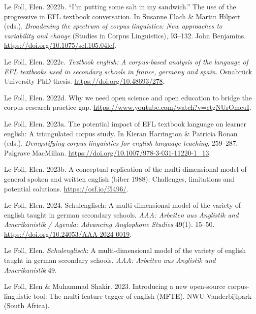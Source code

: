 \documentclass[
  letterpaper,
  DIV=11,
  numbers=noendperiod]{scrreprt}
\newlength{\cslhangindent}
\newenvironment{CSLReferences}[2] %
 {\begin{list}{}{%
  \setlength{\itemindent}{0pt}
  \setlength{\leftmargin}{0pt}
  \setlength{\parsep}{0pt}
  \ifodd #1
   \setlength{\leftmargin}{\cslhangindent}
   \setlength{\itemindent}{-1\cslhangindent}
  \fi
  \setlength{\itemsep}{#2\baselineskip}}}
 {\end{list}}
\begin{document}
\begin{CSLReferences}{1}{0}
Le Foll, Elen. 2022b. {``I'm putting some salt in my sandwich.''} The
use of the progressive in EFL textbook conversation. In Susanne Flach \&
Martin Hilpert (eds.), \emph{Broadening the spectrum of corpus
linguistics: New approaches to variability and change} (Studies in
Corpus Linguistics), 93--132. John Benjamins.
\url{https://doi.org/10.1075/scl.105.04lef}.

Le Foll, Elen. 2022c. \emph{Textbook english: A corpus-based analysis of
the language of EFL textbooks used in secondary schools in france,
germany and spain}. Osnabrück University PhD thesis.
\url{https://doi.org/10.48693/278}.

Le Foll, Elen. 2022d. Why we need open science and open education to
bridge the corpus research-practice gap.
\url{https://www.youtube.com/watch?v=ctgNUrOmcuI}.

Le Foll, Elen. 2023a. The potential impact of EFL textbook language on
learner english: A triangulated corpus study. In Kieran Harrington \&
Patricia Ronan (eds.), \emph{Demystifying corpus linguistics for english
language teaching}, 259--287. Palgrave MacMillan.
\url{https://doi.org/10.1007/978-3-031-11220-1_13}.

Le Foll, Elen. 2023b. A conceptual replication of the multi-dimensional
model of general spoken and written english (biber 1988): Challenges,
limitations and potential solutions. \url{https://osf.io/f5496/}.

Le Foll, Elen. 2024. Schulenglisch: A multi-dimensional model of the
variety of english taught in german secondary schools. \emph{AAA:
Arbeiten aus Anglistik und Amerikanistik / Agenda: Advancing Anglophone
Studies} 49(1). 15--50. \url{https://doi.org/10.24053/AAA-2024-0019}.

Le Foll, Elen. {\emph{Schulenglisch}}: A multi-dimensional model of the
variety of english taught in german secondary schools. \emph{AAA:
Arbeiten aus Anglistik und Amerikanistik} 49.

Le Foll, Elen \& Muhammad Shakir. 2023. Introducing a new open-source
corpus-linguistic tool: The multi-feature tagger of english (MFTE). NWU
Vanderbijlpark (South Africa).


\end{CSLReferences}
\end{document}
